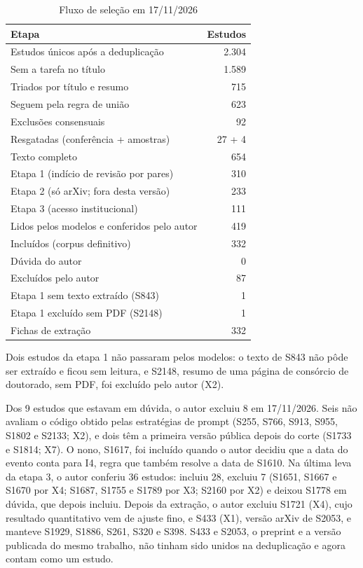 \begin{table}[!t]
\caption{Fluxo de seleção em 17/11/2026}\label{tab:fluxo}
\centering\footnotesize
\begin{tabular}{@{}lr@{}}
\hline
Etapa & Estudos\\
\hline
Estudos únicos após a deduplicação & 2.304\\
\quad Sem a tarefa no título & 1.589\\
Triados por título e resumo & 715\\
\quad Seguem pela regra de união & 623\\
\quad Exclusões consensuais & 92\\
\quad\quad Resgatadas (conferência + amostras) & 27 + 4\\
Texto completo & 654\\
\quad Etapa 1 (indício de revisão por pares) & 310\\
\quad Etapa 2 (só arXiv; fora desta versão) & 233\\
\quad Etapa 3 (acesso institucional) & 111\\
Lidos pelos modelos e conferidos pelo autor & 419\\
\quad Incluídos (corpus definitivo) & 332\\
\quad Dúvida do autor & 0\\
\quad Excluídos pelo autor & 87\\
Etapa 1 sem texto extraído (S843) & 1\\
Etapa 1 excluído sem PDF (S2148) & 1\\
\hline
Fichas de extração & 332\\
\hline
\end{tabular}
\end{table}

Dois estudos da etapa 1 não passaram pelos modelos: o texto de S843 não pôde ser extraído
e ficou sem leitura, e S2148, resumo de uma página de consórcio de doutorado, sem PDF, foi excluído pelo autor
(X2).

Dos 9 estudos que estavam em dúvida, o autor excluiu 8 em 17/11/2026. Seis não avaliam o código obtido pelas
estratégias de prompt (S255, S766, S913, S955, S1802 e S2133; X2), e dois têm a primeira versão pública depois
do corte (S1733 e S1814; X7). O nono, S1617, foi incluído quando o autor decidiu que a data do
evento conta para I4, regra que também resolve a data de S1610. Na última leva da etapa 3, o autor conferiu 36
estudos: incluiu 28, excluiu 7 (S1651, S1667 e S1670 por X4; S1687, S1755 e S1789 por X3; S2160 por X2) e
deixou S1778 em dúvida, que depois incluiu. Depois da extração, o autor excluiu S1721 (X4), cujo resultado
quantitativo vem de ajuste fino, e S433 (X1), versão arXiv de S2053, e manteve S1929, S1886, S261, S320 e S398.
S433 e S2053, o preprint e a versão publicada do mesmo trabalho, não tinham sido unidos na deduplicação e agora
contam como um estudo.

